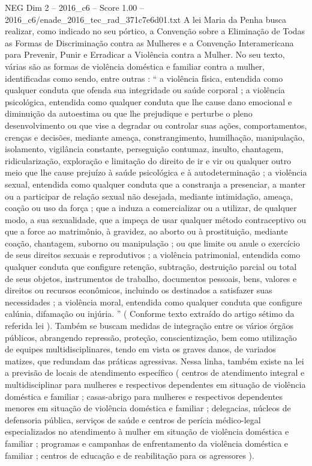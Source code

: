 \begin{textsample}{NEG Dim 2 – 2016\_c6 – Score 1.00 – 2016\_c6/enade\_2016\_tec\_rad\_371c7e6d01.txt}
A lei Maria da Penha busca realizar, como indicado no seu pórtico, a Convenção sobre a Eliminação de Todas as Formas de Discriminação contra as Mulheres e a Convenção Interamericana para Prevenir, Punir e Erradicar a Violência contra a Mulher.
No seu texto, várias são as formas de violência doméstica e familiar contra a mulher, identificadas como sendo, entre outras : “ a violência física, entendida como qualquer conduta que ofenda sua integridade ou saúde corporal ; a violência psicológica, entendida como qualquer conduta que lhe cause dano emocional e diminuição da autoestima ou que lhe prejudique e perturbe o pleno desenvolvimento ou que vise a degradar ou controlar suas ações, comportamentos, crenças e decisões, mediante ameaça, constrangimento, humilhação, manipulação, isolamento, vigilância constante, perseguição contumaz, insulto, chantagem, ridicularização, exploração e limitação do direito de ir e vir ou qualquer outro meio que lhe cause prejuízo à saúde psicológica e à autodeterminação ; a violência sexual, entendida como qualquer conduta que a constranja a presenciar, a manter ou a participar de relação sexual não desejada, mediante intimidação, ameaça, coação ou uso da força ; que a induza a comercializar ou a utilizar, de qualquer modo, a sua sexualidade, que a impeça de usar qualquer método contraceptivo ou que a force ao matrimônio, à gravidez, ao aborto ou à prostituição, mediante coação, chantagem, suborno ou manipulação ; ou que limite ou anule o exercício de seus direitos sexuais e reprodutivos ; a violência patrimonial, entendida como qualquer conduta que configure retenção, subtração, destruição parcial ou total de seus objetos, instrumentos de trabalho, documentos pessoais, bens, valores e direitos ou recursos econômicos, incluindo os destinados a satisfazer suas necessidades ; a violência moral, entendida como qualquer conduta que configure calúnia, difamação ou injúria. ” ( Conforme texto extraído do artigo sétimo da referida lei ).
Também se buscam medidas de integração entre os vários órgãos públicos, abrangendo repressão, proteção, conscientização, bem como utilização de equipes multidisciplinares, tendo em vista os graves danos, de variados matizes, que redundam das práticas agressivas.
Nessa linha, também existe na lei a previsão de locais de atendimento específico ( centros de atendimento integral e multidisciplinar para mulheres e respectivos dependentes em situação de violência doméstica e familiar ; casas-abrigo para mulheres e respectivos dependentes menores em situação de violência doméstica e familiar ; delegacias, núcleos de defensoria pública, serviços de saúde e centros de perícia médico-legal especializados no atendimento à mulher em situação de violência doméstica e familiar ; programas e campanhas de enfrentamento da violência doméstica e familiar ; centros de educação e de reabilitação para os agressores ).

\end{textsample}
